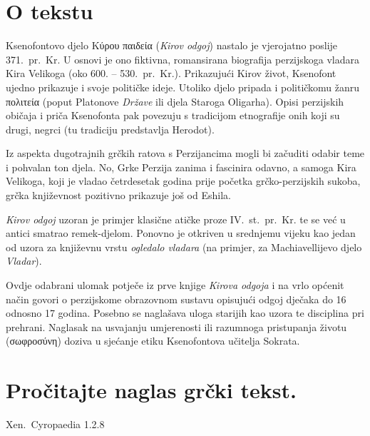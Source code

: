


\section*{O tekstu}

Ksenofontovo djelo Κύρου παιδεία (\textit{Kirov odgoj}) nastalo je vjerojatno poslije 371.\ pr.~Kr. U osnovi je ono fiktivna, romansirana biografija perzijskoga vladara Kira Velikoga (oko 600. – 530.\ pr.~Kr.). Prikazujući Kirov život, Ksenofont ujedno prikazuje i svoje političke ideje. Utoliko djelo pripada i političkomu žanru πολιτεία (poput Platonove \textit{Države} ili djela Staroga Oligarha). Opisi perzijskih običaja i priča Ksenofonta pak povezuju s tradicijom etnografije onih koji su drugi, negrci (tu tradiciju predstavlja Herodot). 

Iz aspekta dugotrajnih grčkih ratova s Perzijancima mogli bi začuditi odabir teme i pohvalan ton djela. No, Grke Perzija zanima i fascinira odavno, a samoga Kira Velikoga, koji je vladao četrdesetak godina prije početka grčko-perzijskih sukoba, grčka književnost pozitivno prikazuje još od Eshila. 

\textit{Kirov odgoj} uzoran je primjer klasične atičke proze IV.~st.\ pr.~Kr. te se već u antici smatrao remek-djelom. Ponovno je otkriven u srednjemu vijeku kao jedan od uzora za književnu vrstu \textit{ogledalo vladara} (na primjer, za Machiavellijevo djelo \textit{Vladar}). 

Ovdje odabrani ulomak potječe iz prve knjige \textit{Kirova odgoja} i na vrlo općenit način govori o perzijskome obrazovnom sustavu opisujući odgoj dječaka do 16 odnosno 17 godina. Posebno se naglašava uloga starijih kao uzora te disciplina pri prehrani. Naglasak na usvajanju umjerenosti ili razumnoga pristupanja životu (σωφροσύνη) doziva u sjećanje etiku Ksenofontova učitelja Sokrata.

\newpage

\section*{Pročitajte naglas grčki tekst.}

Xen.\ Cyropaedia 1.2.8


